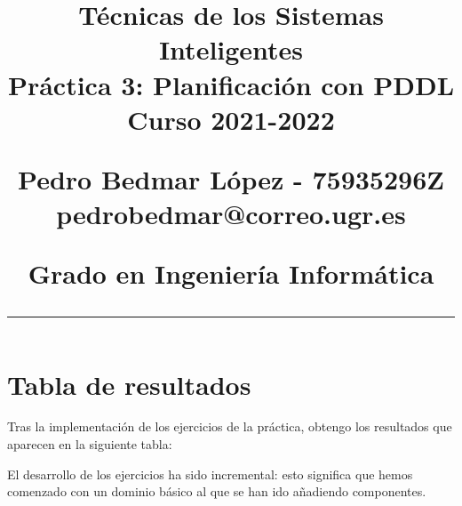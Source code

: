 \documentclass[12pt]{article} %
\title{	

\vspace{-2.5cm}
\LARGE \textbf{Técnicas de los Sistemas Inteligentes} \\
\LARGE Práctica 3: Planificación con PDDL \\[0.5em]
\large Curso 2021-2022 \par
\large Pedro Bedmar López - 75935296Z \\
\normalsize pedrobedmar@correo.ugr.es \par
\large Grado en Ingeniería Informática
\vspace{-7pt}
\rule{\textwidth}{0.4pt}
\vspace{-2cm}
}
\date{}
\begin{document}
\clearpage
\maketitle %

\section{Tabla de resultados}

Tras la implementación de los ejercicios de la práctica, obtengo los resultados que aparecen en la siguiente tabla:
\begin{table}[H]
\end{table}

El desarrollo de los ejercicios ha sido incremental: esto significa que hemos comenzado con un dominio básico al que se han ido añadiendo componentes. 
\end{document}
